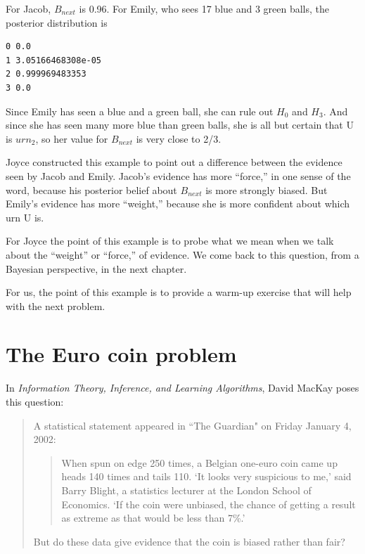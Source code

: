 \documentclass[12pt]{book}
\begin{document}
For Jacob, $B_{next}$ is 0.96.  For Emily, who sees 17 blue and 3 green
balls, the posterior distribution is 

\begin{verbatim}
0 0.0
1 3.05166468308e-05
2 0.999969483353
3 0.0
\end{verbatim}

Since Emily has seen a blue and a green ball, she can rule out $H_0$
and $H_3$.  And since she has seen many more blue than green balls,
she is all but certain that U is $urn_2$, so her value for $B_{next}$
is very close to 2/3.

Joyce constructed this example to point out a difference between the
evidence seen by Jacob and Emily.  Jacob's evidence has more
``force,'' in one sense of the word, because his posterior belief
about $B_{next}$ is more strongly biased.  But Emily's evidence has
more ``weight,'' because she is more confident about which urn U is.

For Joyce the point of this example is to probe what we mean
when we talk about the ``weight'' or ``force,'' of
evidence.  We come back to this question, from a Bayesian
perspective, in the next chapter.

For us, the point of this example is to provide a warm-up exercise
that will help with the next problem.


\section{The Euro coin problem}
\label{euro}

In {\it Information Theory, Inference, and Learning Algorithms}, David MacKay
poses this question:

\begin{quote}
A statistical statement appeared in ``The Guardian" on Friday January 4, 2002:

  \begin{quote}
        When spun on edge 250 times, a Belgian one-euro coin came
        up heads 140 times and tails 110.  `It looks very suspicious
        to me,' said Barry Blight, a statistics lecturer at the London
        School of Economics.  `If the coin were unbiased, the chance of
        getting a result as extreme as that would be less than 7\%.'
        \end{quote}

But do these data give evidence that the coin is biased rather than fair?
\end{quote}
\end{document}
